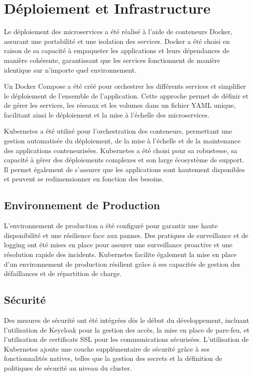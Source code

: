 \documentclass[a4paper, 11pt, openany]{report}
\begin{document}
\clearpage


\section{Déploiement et Infrastructure}
Le déploiement des microservices a été réalisé à l'aide de conteneurs Docker, assurant une portabilité et une isolation des services. Docker a été choisi en raison de sa capacité à empaqueter les applications et leurs dépendances de manière cohérente, garantissant que les services fonctionnent de manière identique sur n'importe quel environnement. 

Un Docker Compose a été créé pour orchestrer les différents services et simplifier le déploiement de l'ensemble de l'application. Cette approche permet de définir et de gérer les services, les réseaux et les volumes dans un fichier YAML unique, facilitant ainsi le déploiement et la mise à l'échelle des microservices.

Kubernetes a été utilisé pour l'orchestration des conteneurs, permettant une gestion automatisée du déploiement, de la mise à l'échelle et de la maintenance des applications conteneurisées. Kubernetes a été choisi pour sa robustesse, sa capacité à gérer des déploiements complexes et son large écosystème de support. Il permet également de s'assurer que les applications sont hautement disponibles et peuvent se redimensionner en fonction des besoins.

\subsection{Environnement de Production}
L'environnement de production a été configuré pour garantir une haute disponibilité et une résilience face aux pannes. Des pratiques de surveillance et de logging ont été mises en place pour assurer une surveillance proactive et une résolution rapide des incidents. Kubernetes facilite également la mise en place d'un environnement de production résilient grâce à ses capacités de gestion des défaillances et de répartition de charge.

\subsection{Sécurité}
Des mesures de sécurité ont été intégrées dès le début du développement, incluant l'utilisation de Keycloak pour la gestion des accès, la mise en place de pare-feu, et l'utilisation de certificats SSL pour les communications sécurisées. L'utilisation de Kubernetes ajoute une couche supplémentaire de sécurité grâce à ses fonctionnalités natives, telles que la gestion des secrets et la définition de politiques de sécurité au niveau du cluster.
\end{document}
